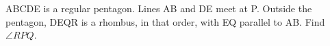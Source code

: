 ABCDE is a regular pentagon. Lines AB and DE meet at P. Outside the pentagon, DEQR is a rhombus, in that order, with EQ parallel to AB. Find $\angle RPQ$.
